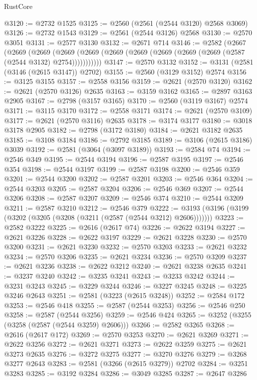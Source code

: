 \begin{lexlean}{RustCore}
\begin{coremodule}
@3120 := @2732 @1525
@3125 := @2560 (@2561 (@2544 @3120) @2568 @3069)
@3126 := @2732 @1543
@3129 := @2561 (@2544 @3126) @2568
@3130 := @2570 @3051
@3131 := @2577 @3130
@3132 := @2671 @714
@3146 := @2582
    (@2667
      (@2669
        (@2669
          (@2669 (@2669 (@2669 (@2669 (@2669 (@2669 (@2669 (@2587 (@2544 @3132) @2754)))))))))))
@3147 := @2570 @3132
@3152 := @3131 (@2581 (@3146 (@2615 @3147)) @2702)
@3155 := @2560 (@3129 @3152) @2574
@3156 := @3125 @3155
@3157 := @2558 @3156
@3159 := @2621 (@2570 @3120)
@3162 := @2621 (@2570 @3126) @2635
@3163 := @3159 @3162
@3165 := @2897 @3163 @2905
@3167 := @2798 (@3157 @3165)
@3170 := @2560 (@3119 @3167) @2574
@3171 := @3115 @3170
@3172 := @2558 @3171
@3174 := @2621 (@2570 @3109)
@3177 := @2621 (@2570 @3116) @2635
@3178 := @3174 @3177
@3180 := @3018 @3178 @2905
@3182 := @2798 (@3172 @3180)
@3184 := @2621 @3182 @2635
@3185 := @3108 @3184
@3186 := @2792 @3185
@3189 := @3106 (@2615 @3186) @3039
@3192 := @2581 (@3064 (@3097 @3189))
@3193 := @2584 @74
@3194 := @2546 @349
@3195 := @2544 @3194
@3196 := @2587 @3195
@3197 := @2546 @354
@3198 := @2544 @3197
@3199 := @2587 @3198
@3200 := @2546 @359
@3201 := @2544 @3200
@3202 := @2587 @3201
@3203 := @2546 @364
@3204 := @2544 @3203
@3205 := @2587 @3204
@3206 := @2546 @369
@3207 := @2544 @3206
@3208 := @2587 @3207
@3209 := @2546 @374
@3210 := @2544 @3209
@3211 := @2587 @3210
@3212 := @2546 @379
@3222 := @3193 (@3196 (@3199 (@3202 (@3205 (@3208 (@3211 (@2587 (@2544 @3212) @2606)))))))
@3223 := @2582 @3222
@3225 := @2616 (@2617 @74)
@3226 := @2622 @3194
@3227 := @2621 @3226
@3228 := @2622 @3197
@3229 := @2621 @3228
@3230 := @2570 @3200
@3231 := @2621 @3230
@3232 := @2570 @3203
@3233 := @2621 @3232
@3234 := @2570 @3206
@3235 := @2621 @3234
@3236 := @2570 @3209
@3237 := @2621 @3236
@3238 := @2622 @3212
@3240 := @2621 @3238 @2635
@3241 := @3237 @3240
@3242 := @3235 @3241
@3243 := @3233 @3242
@3244 := @3231 @3243
@3245 := @3229 @3244
@3246 := @3227 @3245
@3248 := @3225 @3246 @2643
@3251 := @2581 (@3223 (@2615 @3248))
@3252 := @2584 @172
@3253 := @2546 @418
@3255 := @2587 (@2544 @3253)
@3256 := @2546 @250
@3258 := @2587 (@2544 @3256)
@3259 := @2546 @424
@3265 := @3252 (@3255 (@3258 (@2587 (@2544 @3259) @2606)))
@3266 := @2582 @3265
@3268 := @2616 (@2617 @172)
@3269 := @2570 @3253
@3270 := @2621 @3269
@3271 := @2622 @3256
@3272 := @2621 @3271
@3273 := @2622 @3259
@3275 := @2621 @3273 @2635
@3276 := @3272 @3275
@3277 := @3270 @3276
@3279 := @3268 @3277 @2643
@3283 := @2581 (@3266 (@2615 @3279)) @2702
@3284 := @3251 @3283
@3285 := @3192 @3284
@3286 := @3049 @3285
@3287 := @2647 @3286

\end{coremodule}
\end{lexlean}
